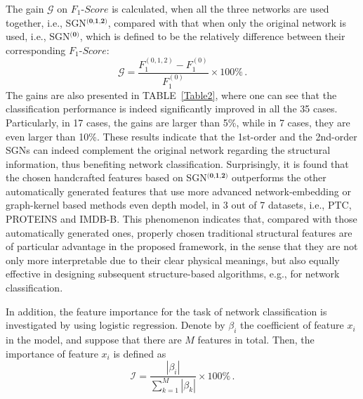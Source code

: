 \documentclass[10pt,journal,compsoc]{IEEEtran}
\begin{document}
The gain $\mathcal{G}$ on $F_1$-$Score$ is calculated, when all the three networks are used together, i.e., SGN$^{\textbf{(0,1,2)}}$, compared with that when only the original network is used, i.e., SGN$^{\textbf{(0)}}$, which is defined to be the relatively difference between their corresponding $F_1$-$Score$:
\begin{equation}
\mathcal{G}=\frac{F_1^{(0,1,2)}-F_1^{(0)}}{F_1^{(0)}}\times{100\%}\,.
\end{equation}
The gains are also presented in TABLE~\ref{Table2}, where one can see that the classification performance is indeed significantly improved in all the 35 cases. Particularly, in 17 cases, the gains are larger than 5\%, while in 7 cases, they are even larger than 10\%. These results indicate that the 1st-order and the 2nd-order SGNs can indeed complement the original network regarding the structural information, thus benefiting network classification. Surprisingly, it is found that the chosen handcrafted features based on SGN$^{\textbf{(0,1,2)}}$ outperforms the other automatically generated features that use more advanced network-embedding or graph-kernel based methods even depth model, in 3 out of 7 datasets, i.e., PTC, PROTEINS and IMDB-B. This phenomenon indicates that, compared with those automatically generated ones, properly chosen traditional structural features are of particular advantage in the proposed framework, in the sense that they are not only more interpretable due to their clear physical meanings, but also equally effective in designing subsequent structure-based algorithms, e.g., for network classification.

In addition, the feature importance for the task of network classification is investigated by using logistic regression. Denote by $\beta_i$ the coefficient of feature $x_i$ in the model, and suppose that there are $M$ features in total. Then, the importance of feature $x_i$ is defined as
\begin{equation}
\mathcal{I}=\frac{|\beta_i|}{\sum_{k=1}^M{|\beta_k|}}\times{100\%}\,.
\end{equation}
\end{document}
